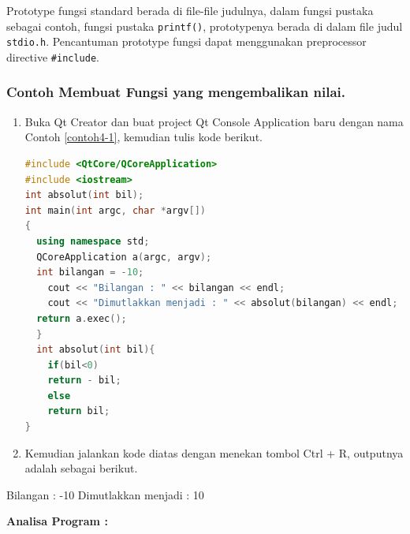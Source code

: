 Prototype fungsi standard berada di file-file judulnya, dalam fungsi
pustaka sebagai contoh, fungsi pustaka \texttt{printf()}, prototypenya
berada di dalam file judul \texttt{stdio.h}. Pencantuman prototype
fungsi dapat menggunakan preprocessor directive \texttt{\#include}.

\subsubsection*{Contoh  Membuat Fungsi yang mengembalikan nilai.}

\begin{enumerate}

\item
  Buka Qt Creator dan buat project Qt Console Application baru dengan
  nama Contoh \ref{contoh4-1}, kemudian tulis kode berikut.

\begin{lstlisting}[language=c++, caption=Membuat Fungsi yang mengembalikan nilai, label=contoh4-1]
#include <QtCore/QCoreApplication>
#include <iostream>
int absolut(int bil);
int main(int argc, char *argv[])
{
  using namespace std;
  QCoreApplication a(argc, argv);
  int bilangan = -10;
    cout << "Bilangan : " << bilangan << endl;
    cout << "Dimutlakkan menjadi : " << absolut(bilangan) << endl;
  return a.exec();
  }
  int absolut(int bil){
    if(bil<0)
    return - bil;
    else
    return bil;
}
\end{lstlisting}
\item
  Kemudian jalankan kode diatas dengan menekan tombol Ctrl + R, outputnya
  adalah sebagai berikut.
\end{enumerate}
\begin{lcverbatim}
Bilangan : -10
Dimutlakkan menjadi : 10
\end{lcverbatim}


\textbf{Analisa Program :}


